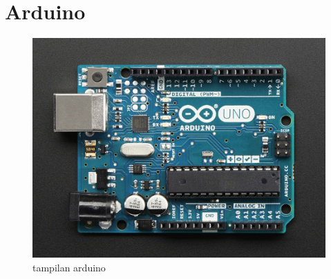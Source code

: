 

\section{Arduino}
	\begin{figure}[ht]
	\centerline{\includegraphics[width=1\textwidth]{figures/arduino2.JPG}}
	\caption{tampilan arduino}
	\label{arduino}
	\end{figure}
